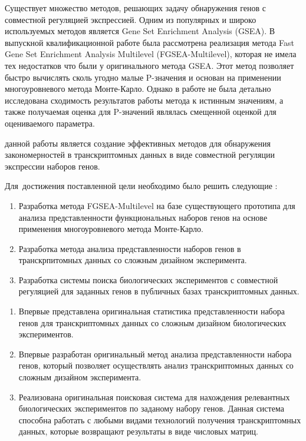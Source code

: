 

{\progress} Существует множество методов, решающих задачу обнаружения генов с совместной регуляцией экспрессией.
Одним из популярных и широко используемых методов является Gene Set Enrichment Analysis (GSEA).
В выпускной квалификационной работе \cite{KorotkevichVKR} была рассмотрена реализация метода Fast Gene Set Enrichment Analysis Multilevel (FGSEA-Multilevel), которая не имела тех недостатков что были у оригинального метода GSEA.
Этот метод позволяет быстро вычислять сколь угодно малые P-значения и основан на применении многоуровневого метода Монте-Карло.
Однако в работе не была детально исследована сходимость результатов работы метода к истинным значениям, а также получаемая оценка для P-значений являлась смещенной оценкой для оцениваемого параметра.


{\aim} данной работы является создание эффективных методов для обнаружения закономерностей в транскриптомных данных в виде совместной регуляции экспрессии наборов генов.

Для~достижения поставленной цели необходимо было решить следующие {\tasks}:
\begin{enumerate}[beginpenalty=10000] %
  \item Разработка метода FGSEA-Multilevel на базе существующего прототипа для анализа представленности функциональных наборов генов на основе применения многоуровневого метода Монте-Карло.
  \item Разработка метода анализа представленности наборов генов в транскрпитомных данных со сложным дизайном эксперимента.
  \item Разработка системы поиска биологических экспериментов с совместной регуляцией для заданных генов в публичных базах транскриптомных данных.
\end{enumerate}


{\novelty}
\begin{enumerate}[beginpenalty=10000] %
  \item Впервые представлена оригинальная статистика представленности набора генов для транскриптомных данных со сложным дизайном биологических экспериментов.
  \item Впервые разработан оригинальный метод анализа представленности набора генов, который позволяет осуществлять анализ транскриптомных данных со сложным дизайном эксперимента. 
  \item Реализована оригинальная поисковая система для нахождения релевантных биологических экспериментов по заданому набору генов. Данная система способна работать с любыми видами технологий получения транскриптомных данных, которые возвращают результаты в виде числовых матриц.
\end{enumerate}


